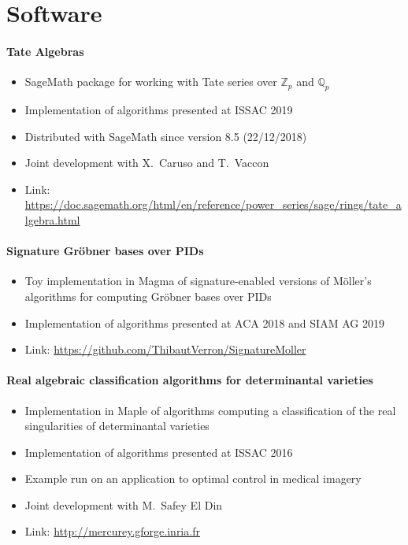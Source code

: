 \documentclass{scrartcl}
\begin{document}

\section*{Software}
\label{sec:Software}

\paragraph{Tate Algebras}
\begin{itemize}[itemsep=0pt]
  \item SageMath package for working with Tate series over
  \(\mathbb{Z}_p\) and \(\mathbb{Q}_p\)
  \item Implementation of algorithms presented at ISSAC 2019
  \item Distributed with SageMath since version 8.5 (22/12/2018)
  \item Joint development with X.~Caruso and T.~Vaccon
  \item Link: \url{https://doc.sagemath.org/html/en/reference/power_series/sage/rings/tate_algebra.html}
\end{itemize}

\paragraph{Signature Gröbner bases over PIDs}
\begin{itemize}[itemsep=0pt]
  \item Toy implementation in Magma of signature-enabled versions of Möller's algorithms for computing Gröbner bases over PIDs
  \item Implementation of algorithms presented at ACA 2018 and SIAM AG 2019
  \item Link: \url{https://github.com/ThibautVerron/SignatureMoller}
\end{itemize}

\paragraph{Real algebraic classification algorithms for determinantal varieties}

\begin{itemize}[itemsep=0pt]
  \item Implementation in Maple of algorithms computing a classification of the real singularities of determinantal varieties
  \item Implementation of algorithms presented at ISSAC 2016
  \item Example run on an application to optimal control in medical imagery
  \item Joint development with M.~Safey El Din
  \item Link: \url{http://mercurey.gforge.inria.fr}
\end{itemize}
\end{document}
